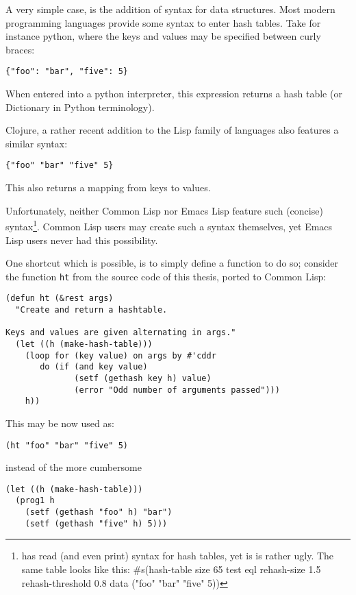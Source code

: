\documentclass[a4paper]{article}
\newcommand{\el}{Emacs Lisp}
\newcommand{\cl}{Common Lisp}
\newcommand{\fun}[1]{\texttt{#1}}
\begin{document}
A very simple case, is the addition of syntax for data structures.  Most modern
programming languages provide some syntax to enter hash tables.  Take for
instance python, where the keys and values may be specified between curly
braces:

\begin{verbatim}
{"foo": "bar", "five": 5}
\end{verbatim}

When entered into a python interpreter, this expression returns a hash table (or
Dictionary in Python terminology).

Clojure, a rather recent addition to the Lisp family of languages also features
a similar syntax:

\begin{verbatim}
{"foo" "bar" "five" 5}
\end{verbatim}

This also returns a mapping from keys to values.

Unfortunately, neither \cl{} nor \el{} feature such (concise)
syntax\footnote{has read (and even print) syntax for hash tables, yet is is
  rather ugly.  The same table looks like this: \#s(hash-table size 65 test eql
  rehash-size 1.5 rehash-threshold 0.8 data ("foo" "bar" "five" 5))}.  \cl{}
users may create such a syntax themselves, yet \el{} users never had this
possibility.

One shortcut which is possible, is to simply define a function to do so;
consider the function \fun{ht} from the source code of this thesis, ported to
\cl{}:

\begin{verbatim}
(defun ht (&rest args)
  "Create and return a hashtable.

Keys and values are given alternating in args."
  (let ((h (make-hash-table)))
    (loop for (key value) on args by #'cddr
       do (if (and key value)
              (setf (gethash key h) value)
              (error "Odd number of arguments passed")))
    h))
\end{verbatim}

This may be now used as:

\begin{verbatim}
(ht "foo" "bar" "five" 5)
\end{verbatim}

instead of the more cumbersome

\begin{verbatim}
(let ((h (make-hash-table)))
  (prog1 h
    (setf (gethash "foo" h) "bar")
    (setf (gethash "five" h) 5)))
\end{verbatim}
\end{document}
